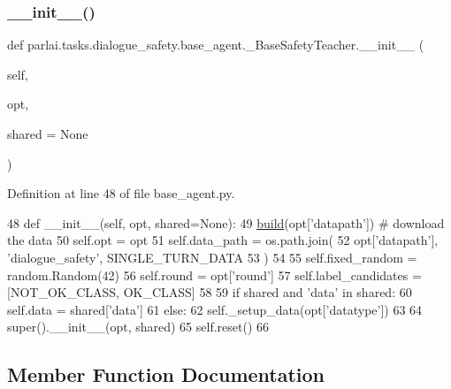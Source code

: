 \subsubsection{\texorpdfstring{\+\_\+\+\_\+init\+\_\+\+\_\+()}{\_\_init\_\_()}}
{\footnotesize\ttfamily def parlai.\+tasks.\+dialogue\+\_\+safety.\+base\+\_\+agent.\+\_\+\+Base\+Safety\+Teacher.\+\_\+\+\_\+init\+\_\+\+\_\+ (\begin{DoxyParamCaption}\item[{}]{self,  }\item[{}]{opt,  }\item[{}]{shared = {\ttfamily None} }\end{DoxyParamCaption})}



Definition at line 48 of file base\+\_\+agent.\+py.


\begin{DoxyCode}
48     \textcolor{keyword}{def }\_\_init\_\_(self, opt, shared=None):
49         \hyperlink{namespaceparlai_1_1mturk_1_1tasks_1_1talkthewalk_1_1download_a8c0fbb9b6dfe127cb8c1bd6e7c4e33fd}{build}(opt[\textcolor{stringliteral}{'datapath'}])  \textcolor{comment}{# download the data}
50         self.opt = opt
51         self.data\_path = os.path.join(
52             opt[\textcolor{stringliteral}{'datapath'}], \textcolor{stringliteral}{'dialogue\_safety'}, SINGLE\_TURN\_DATA
53         )
54 
55         self.fixed\_random = random.Random(42)
56         self.round = opt[\textcolor{stringliteral}{'round'}]
57         self.label\_candidates = [NOT\_OK\_CLASS, OK\_CLASS]
58 
59         \textcolor{keywordflow}{if} shared \textcolor{keywordflow}{and} \textcolor{stringliteral}{'data'} \textcolor{keywordflow}{in} shared:
60             self.data = shared[\textcolor{stringliteral}{'data'}]
61         \textcolor{keywordflow}{else}:
62             self.\_setup\_data(opt[\textcolor{stringliteral}{'datatype'}])
63 
64         super().\_\_init\_\_(opt, shared)
65         self.reset()
66 
\end{DoxyCode}


\subsection{Member Function Documentation}
\mbox{\label{classparlai_1_1tasks_1_1dialogue__safety_1_1base__agent_1_1__BaseSafetyTeacher_ac00c909c61e5622dd2053c14f898414d}} 
